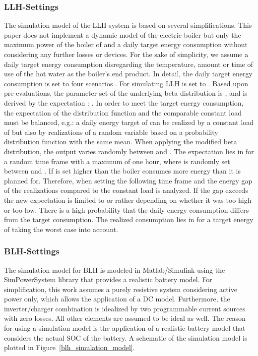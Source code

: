 \documentclass{article}
\begin{document}
\subsubsection{\ac{LLH}-Settings}
The simulation model of the \ac{LLH} system is based on several simplifications.
This paper does not implement a dynamic model of the electric boiler but only the maximum power of the boiler of  and a daily target energy consumption without considering any further losses or devices. 
For the sake of simplicity, we assume a daily target energy consumption disregarding the temperature, amount or time of use of the hot water as the boiler's end product.
In detail, the daily target energy consumption is set to four scenarios .
For simulating \ac{LLH}  is set to . Based upon pre-evaluations, the parameter set of the underlying beta distribution is , and  is derived by the expectation : . In order to meet the target energy consumption, the expectation of the distribution function and the comparable constant load must be balanced, e.g.: a daily energy target of  can be realized by a constant load of  but also by realizations of a random variable based on a probability distribution function with the same mean. 
When applying the modified beta distribution, the output varies randomly between  and . The expectation lies in  for a random time frame with a maximum of one hour, where  is randomly set between  and . If  is set higher than  the boiler consumes more energy than it is planned for. Therefore, when setting the following time frame and  the energy gap of the realizations compared to the constant load  is analyzed. If the gap exceeds  the new expectation is limited to  or rather  depending on whether it was too high or too low. There is a high probability that the daily energy consumption differs from the target consumption. The realized consumption lies in  for a target energy of  taking the worst case into account.

\subsubsection{BLH-Settings}
The simulation model for \ac{BLH} is modeled in Matlab/Simulink using the SimPowerSystem library that provides a realistic battery model. 
For simplification, this work assumes a purely resistive system considering active power only, which allows the application of a DC model. Furthermore, the inverter/charger combination is idealized by two programmable current sources with zero losses. All other elements are assumed to be ideal as well. The reason for using a simulation model is the application of a realistic battery model that considers the actual \ac{SOC} of the battery. A schematic of the simulation model is plotted in Figure~\ref{blh_simulation_model}.
\end{document}
